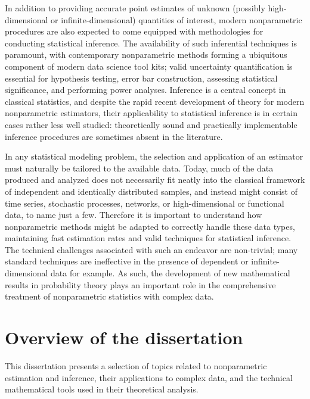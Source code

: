 In addition to providing accurate point estimates of unknown (possibly
high-dimensional or infinite-dimensional) quantities of interest, modern
nonparametric procedures are also expected to come equipped with methodologies
for conducting statistical inference. The availability of such inferential
techniques is paramount, with contemporary nonparametric methods forming a
ubiquitous component of modern data science tool kits; valid uncertainty
quantification is essential for hypothesis testing, error bar construction,
assessing statistical significance, and performing power analyses. Inference is
a central concept in classical statistics, and despite the rapid
recent development of theory for modern nonparametric estimators, their
applicability to statistical inference is in certain cases rather less well
studied: theoretically sound and practically implementable inference procedures
are sometimes absent in the literature.

In any statistical modeling problem, the selection and application of an
estimator must naturally be tailored to the available data. Today, much of the
data produced and analyzed does not necessarily fit neatly into the classical
framework of independent and identically distributed samples, and instead might
consist of time series, stochastic processes, networks,
or high-dimensional or functional data, to name just a few.
Therefore it is important to understand how nonparametric methods might be
adapted to correctly handle these data types, maintaining fast estimation rates
and valid techniques for statistical inference. The technical challenges
associated with such an endeavor are non-trivial; many standard techniques are
ineffective in the presence of dependent or infinite-dimensional data for
example. As such, the development of new mathematical results in probability
theory plays an important role in the comprehensive treatment of nonparametric
statistics with complex data.

\section*{Overview of the dissertation}

This dissertation presents a selection of topics related to nonparametric
estimation and inference, their applications to complex data, and the technical
mathematical tools used in their theoretical analysis.

